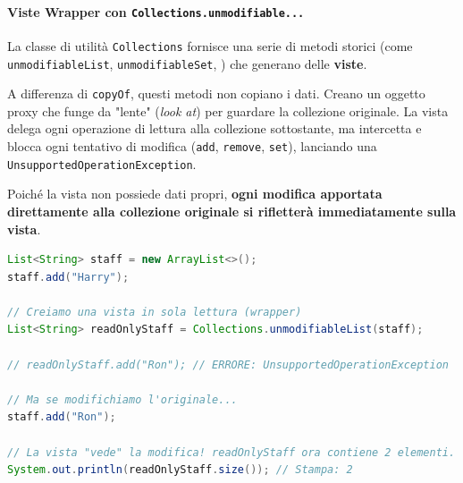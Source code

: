 \paragraph{Viste Wrapper con \texttt{Collections.unmodifiable...}}

La classe di utilità \texttt{Collections} fornisce una serie di metodi storici (come \texttt{unmodifiableList}, \texttt{unmodifiableSet}, ) che generano delle \textbf{viste}.

A differenza di \texttt{copyOf}, questi metodi non copiano i dati. Creano un oggetto proxy che funge da "lente" (\textit{look at}) per guardare la collezione originale. 
La vista delega ogni operazione di lettura alla collezione sottostante, ma intercetta e blocca ogni tentativo di modifica (\texttt{add}, \texttt{remove}, \texttt{set}), lanciando una \texttt{UnsupportedOperationException}.

Poiché la vista non possiede dati propri, \textbf{ogni modifica apportata direttamente alla collezione originale si rifletterà immediatamente sulla vista}.

\begin{lstlisting}[language=Java, caption={Comportamento dinamico della vista unmodifiable}]
List<String> staff = new ArrayList<>();
staff.add("Harry");

// Creiamo una vista in sola lettura (wrapper)
List<String> readOnlyStaff = Collections.unmodifiableList(staff);

// readOnlyStaff.add("Ron"); // ERRORE: UnsupportedOperationException

// Ma se modifichiamo l'originale...
staff.add("Ron");

// La vista "vede" la modifica! readOnlyStaff ora contiene 2 elementi.
System.out.println(readOnlyStaff.size()); // Stampa: 2
\end{lstlisting}

